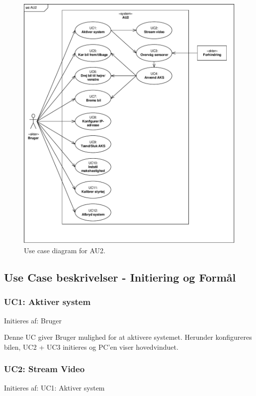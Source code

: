 \begin{figure}[h]
\centering
\includegraphics[width=\textwidth - 1 cm]{../fig/diagrammer/uc_au2.pdf}
\caption{Use case diagram for AU2.}
\label{fig:UC_au2}
\end{figure}
\clearpage


\subsection{Use Case beskrivelser - Initiering og Formål} 
\subsubsection{UC1: Aktiver system}
Initieres af: Bruger

Denne UC giver Bruger mulighed for at aktivere systemet. Herunder konfigureres bilen, UC2 + UC3 initieres og PC'en viser hovedvinduet. 

\subsubsection{UC2: Stream Video}
Initieres af: UC1: Aktiver system

